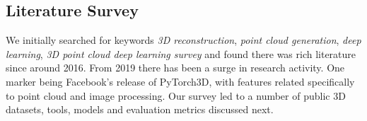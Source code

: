 \subsection{Literature Survey}

We initially searched for keywords \textit{3D reconstruction}, \textit{point cloud generation}, \textit{deep learning}, \textit{3D point cloud deep learning survey} and found there was rich literature since around 2016. From 2019 there has been a surge in research activity. One marker being Facebook's release of PyTorch3D, with features related specifically to point cloud and image processing.  
Our survey led to a number of public 3D datasets, tools, models and evaluation metrics discussed next.